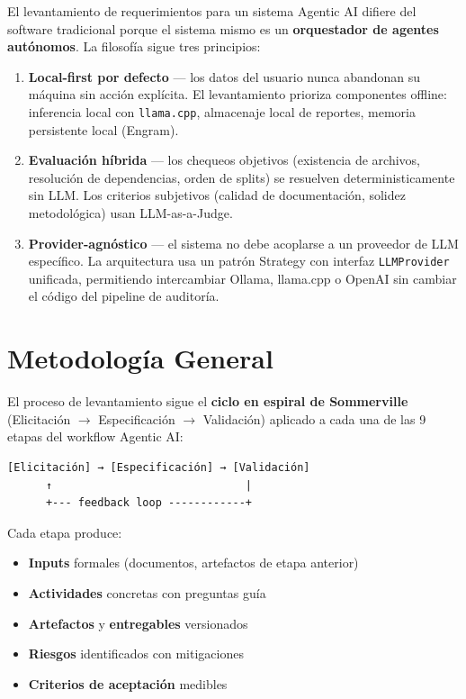 \documentclass[12pt,a4paper]{article}
\begin{document}
El levantamiento de requerimientos para un sistema Agentic AI difiere del software tradicional porque el sistema mismo es un \textbf{orquestador de agentes autónomos}. La filosofía sigue tres principios:

\begin{enumerate}
  \item \textbf{Local-first por defecto} --- los datos del usuario nunca abandonan su máquina sin acción explícita. El levantamiento prioriza componentes offline: inferencia local con \texttt{llama.cpp}, almacenaje local de reportes, memoria persistente local (Engram).

  \item \textbf{Evaluación híbrida} --- los chequeos objetivos (existencia de archivos, resolución de dependencias, orden de splits) se resuelven deterministicamente sin LLM. Los criterios subjetivos (calidad de documentación, solidez metodológica) usan LLM-as-a-Judge.

  \item \textbf{Provider-agnóstico} --- el sistema no debe acoplarse a un proveedor de LLM específico. La arquitectura usa un patrón Strategy con interfaz \texttt{LLMProvider} unificada, permitiendo intercambiar Ollama, llama.cpp o OpenAI sin cambiar el código del pipeline de auditoría.
\end{enumerate}

\section{Metodología General}

El proceso de levantamiento sigue el \textbf{ciclo en espiral de Sommerville} (Elicitación $\rightarrow$ Especificación $\rightarrow$ Validación) aplicado a cada una de las 9 etapas del workflow Agentic AI:

\begin{verbatim}
[Elicitación] → [Especificación] → [Validación]
      ↑                              |
      +--- feedback loop ------------+
\end{verbatim}

Cada etapa produce:
\begin{itemize}
  \item \textbf{Inputs} formales (documentos, artefactos de etapa anterior)
  \item \textbf{Actividades} concretas con preguntas guía
  \item \textbf{Artefactos} y \textbf{entregables} versionados
  \item \textbf{Riesgos} identificados con mitigaciones
  \item \textbf{Criterios de aceptación} medibles
\end{itemize}
\end{document}
